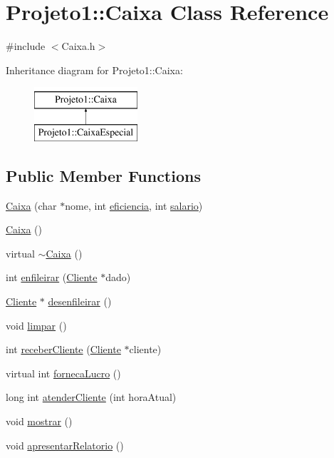 \hypertarget{classProjeto1_1_1Caixa}{
\section{Projeto1::Caixa Class Reference}
\label{classProjeto1_1_1Caixa}
}


{\ttfamily \#include $<$Caixa.h$>$}

Inheritance diagram for Projeto1::Caixa:\begin{figure}[H]
\begin{center}
\leavevmode
\includegraphics[height=2.000000cm]{classProjeto1_1_1Caixa}
\end{center}
\end{figure}
\subsection*{Public Member Functions}
\begin{DoxyCompactItemize}
\item 
\hyperlink{classProjeto1_1_1Caixa_ac54adc569decc044934b973b4066f82e}{Caixa} (char $\ast$nome, int \hyperlink{classProjeto1_1_1Caixa_aeb2c7dca9680e644f88f3bb9eb606c2a}{eficiencia}, int \hyperlink{classProjeto1_1_1Caixa_ad9f8c9b65400bd1db9004dbb3c9f18ea}{salario})
\item 
\hyperlink{classProjeto1_1_1Caixa_a3186951816b7bba0b473a97d1fc44565}{Caixa} ()
\item 
virtual \hyperlink{classProjeto1_1_1Caixa_a5860cd7dc1a6fb064f025b8cd24cc872}{$\sim$Caixa} ()
\item 
int \hyperlink{classProjeto1_1_1Caixa_a9501a2f8df6c4717db844327ac8c3a82}{enfileirar} (\hyperlink{classProjeto1_1_1Cliente}{Cliente} $\ast$dado)
\item 
\hyperlink{classProjeto1_1_1Cliente}{Cliente} $\ast$ \hyperlink{classProjeto1_1_1Caixa_a60a829984934de75e264bfebbebb56fb}{desenfileirar} ()
\item 
void \hyperlink{classProjeto1_1_1Caixa_a4363134abfee713c0d02f47510b4e93f}{limpar} ()
\item 
int \hyperlink{classProjeto1_1_1Caixa_a0492c45bba7b53805bfe322ec1e8b993}{receberCliente} (\hyperlink{classProjeto1_1_1Cliente}{Cliente} $\ast$cliente)
\item 
virtual int \hyperlink{classProjeto1_1_1Caixa_a70c900f948864a28e2661dab17b10f9f}{fornecaLucro} ()
\item 
long int \hyperlink{classProjeto1_1_1Caixa_af082f5059bce22f7ed3d72de9e6b0fad}{atenderCliente} (int horaAtual)
\item 
void \hyperlink{classProjeto1_1_1Caixa_ae4c5c43dfcbae9198ae70624505f74b5}{mostrar} ()
\item 
void \hyperlink{classProjeto1_1_1Caixa_af4a87b003b6be708d883908573b0f88a}{apresentarRelatorio} ()
\end{DoxyCompactItemize}
